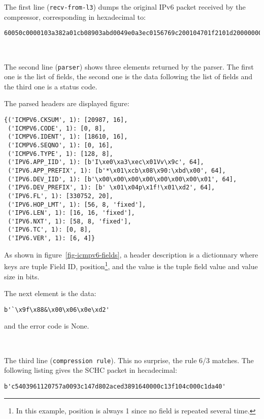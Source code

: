 The first line (\texttt{recv-from-l3}) dumps the original IPv6 packet received by the compressor, corresponding in hexadecimal to:

\begin{lstlisting}[basicstyle=\ttfamily\tiny]
60050c0000103a382a01cb08903abd0049e0a3ec0156769c200104701f2101d20000000000000001800051fb48b20000609f882600060ed2
\end{lstlisting}

~  

The second line (\texttt{parser}) shows three elements returned by the parser. The first one is the list of fields, the second one is the data following the list of fields and the third one is a status code.

The parsed headers are displayed figure:

\begin{lstlisting}[caption={Header Fields of an ICMPv6 message}, label=fig-icmpv6-fields]
{('ICMPV6.CKSUM', 1): [20987, 16],
 ('ICMPV6.CODE', 1): [0, 8],
 ('ICMPV6.IDENT', 1): [18610, 16],
 ('ICMPV6.SEQNO', 1): [0, 16],
 ('ICMPV6.TYPE', 1): [128, 8],
 ('IPV6.APP_IID', 1): [b'I\xe0\xa3\xec\x01Vv\x9c', 64],
 ('IPV6.APP_PREFIX', 1): [b'*\x01\xcb\x08\x90:\xbd\x00', 64],
 ('IPV6.DEV_IID', 1): [b'\x00\x00\x00\x00\x00\x00\x00\x01', 64],
 ('IPV6.DEV_PREFIX', 1): [b' \x01\x04p\x1f!\x01\xd2', 64],
 ('IPV6.FL', 1): [330752, 20],
 ('IPV6.HOP_LMT', 1): [56, 8, 'fixed'],
 ('IPV6.LEN', 1): [16, 16, 'fixed'],
 ('IPV6.NXT', 1): [58, 8, 'fixed'],
 ('IPV6.TC', 1): [0, 8],
 ('IPV6.VER', 1): [6, 4]}
\end{lstlisting}

As shown in figure~\vref{fig-icmpv6-fields}, a header description is a dictionnary where keys are tuple Field ID, position\footnote{In this example, position is always 1 since no field is repeated several time.}, and the value is the tuple field value and value size in bits.

The next element is the data:

\begin{lstlisting}
b'`\x9f\x88&\x00\x06\x0e\xd2'
\end{lstlisting}

and the error code is None.

~~

The third line (\texttt{compression rule}). This no surprise, the rule 6/3 matches. The following listing gives the SCHC packet in hecadecimal:


\begin{lstlisting}
b'c5403961120757a0093c147d802aced3891640000c13f104c000c1da40'
\end{lstlisting}

